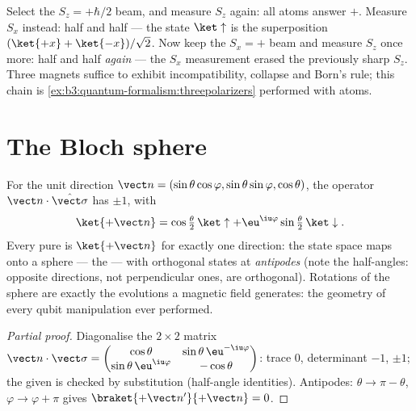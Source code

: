 \begin{example}\label{ex:b3:spin-two-level:chained}
Select the $S_z = +\hbar/2$ beam, and measure $S_z$ again: all
atoms answer $+$. Measure $S_x$ instead: half and half --- the state
$\ket\uparrow$ is the superposition $(\ket{+x} + \ket{-x})/\sqrt2$.
Now keep the $S_x = +$ beam and measure $S_z$ once more: half and
half \emph{again} --- the $S_x$ measurement erased the previously
sharp $S_z$. Three magnets suffice to exhibit incompatibility,
collapse and Born's rule; this chain is
\cref{ex:b3:quantum-formalism:threepolarizers} performed with atoms.
\end{example}

\section{The Bloch sphere}

\begin{proposition}\label{prop:b3:spin-two-level:bloch}
For the unit direction $\vect n = (\sin\theta\cos\varphi,
\sin\theta\sin\varphi, \cos\theta)$, the operator $\vect
n\cdot\hat{\vect\sigma}$ has  $\pm1$, with
\[
\ket{+\vect n} = \cos\tfrac\theta2\,\ket\uparrow +
\eu^{\iu\varphi}\sin\tfrac\theta2\,\ket\downarrow .
\]
Every pure  is $\ket{+\vect n}$ for exactly one direction: the
state space maps onto a sphere --- the \emph{} --- with
orthogonal states at \emph{antipodes} (note the half-angles: opposite
directions, not perpendicular ones, are orthogonal). Rotations of
the sphere are exactly the evolutions a magnetic field generates:
the geometry of every qubit manipulation ever performed.
\end{proposition}

\begin{proof}[Partial proof]
Diagonalise the $2\times2$ matrix $\vect n\cdot\vect\sigma =
\begin{pmatrix}\cos\theta & \sin\theta\,\eu^{-\iu\varphi}\\
\sin\theta\,\eu^{\iu\varphi} & -\cos\theta\end{pmatrix}$: trace $0$,
determinant $-1$,  $\pm1$; the given  is checked by
substitution (half-angle identities). Antipodes: $\theta \to \pi -
\theta$, $\varphi \to \varphi + \pi$ gives $\braket{+\vect
n'}{+\vect n} = 0$.
\end{proof}

